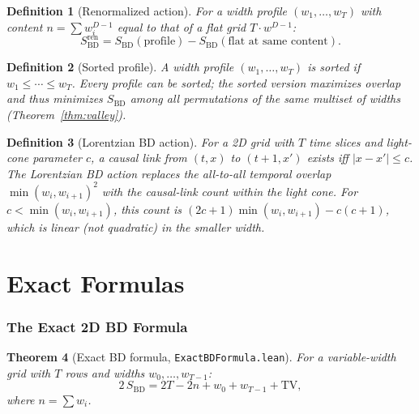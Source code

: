 \documentclass[11pt,a4paper]{article}
\newtheorem{theorem}{Theorem}[section]
\newtheorem{definition}[theorem]{Definition}
\theoremstyle{remark}
\begin{document}
\begin{definition}[Renormalized action]\label{def:ren}
For a width profile $(w_1,\ldots,w_T)$ with \emph{content} $n = \sum w_i^{D-1}$
equal to that of a flat grid $T \cdot w^{D-1}$:
\begin{equation}
  S_{\mathrm{BD}}^{\mathrm{ren}} = S_{\mathrm{BD}}(\text{profile})
  - S_{\mathrm{BD}}(\text{flat at same content}).
\end{equation}
\end{definition}

\begin{definition}[Sorted profile]
A width profile $(w_1,\ldots,w_T)$ is \emph{sorted} if $w_1 \leq \cdots \leq w_T$.
Every profile can be sorted; the sorted version maximizes overlap and thus
minimizes $S_{\mathrm{BD}}$ among all permutations of the same multiset of widths
(Theorem~\ref{thm:valley}).
\end{definition}

\begin{definition}[Lorentzian BD action]
For a 2D grid with $T$ time slices and \emph{light-cone parameter} $c$, a
\emph{causal link} from $(t,x)$ to $(t{+}1,x')$ exists iff $|x - x'| \leq c$.
The \emph{Lorentzian BD action} replaces the all-to-all temporal overlap
$\min(w_i,w_{i+1})^2$ with the causal-link count within the light cone.
For $c < \min(w_i, w_{i+1})$, this count is $(2c{+}1)\min(w_i,w_{i+1}) - c(c{+}1)$,
which is \emph{linear} (not quadratic) in the smaller width.
\end{definition}

\part{Exact Formulas}

\section{The Exact 2D BD Formula}\label{sec:exact}

\begin{theorem}[Exact BD formula, \texttt{ExactBDFormula.lean}]
\label{thm:exact}
For a variable-width grid with $T$ rows and widths $w_0, \ldots, w_{T-1}$:
\begin{equation}
  2\,S_{\mathrm{BD}} = 2T - 2n + w_0 + w_{T-1} + \mathrm{TV},
\end{equation}
where $n = \sum w_i$.
\end{theorem}
\end{document}
